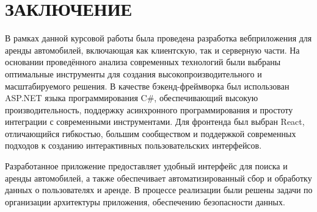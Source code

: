 \chapter*{ЗАКЛЮЧЕНИЕ}

В рамках данной курсовой работы была проведена разработка вебприложения для аренды автомобилей, включающая как клиентскую, так и серверную части. На основании проведённого анализа современных технологий были выбраны оптимальные инструменты для создания высокопроизводительного и масштабируемого решения. В качестве бэкенд-фреймворка был использован ASP.NET языка программирования C\#, обеспечивающий высокую производительность, поддержку асинхронного программирования и простоту интеграции с современными инструментами. Для фронтенда был выбран React, отличающийся гибкостью, большим сообществом и поддержкой современных подходов к созданию интерактивных пользовательских интерфейсов.

Разработанное приложение предоставляет удобный интерфейс для поиска и аренды автомобилей, а также обеспечивает автоматизированный сбор и обработку данных о пользователях и аренде. В процессе реализации были решены задачи по организации архитектуры приложения, обеспечению безопасности данных.
